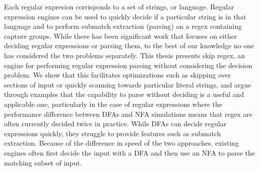\begin{thesisabstract}

Each regular expresion corrisponds to a set of strings, or
language. Regular expression engines can be used to quickly decide
if a particular string is in that language and to
perform submatch extraction (parsing) on a regex containing
capture groups. While there has been significant work that focuses on either
deciding regular expressions or parsing them, to
the best of our knowledge no one has considered the
two problems separately. This thesis presents skip
regex, an engine for performing regular expression
parsing without considering the decision problem.
We show that this facilitates optimizations such as skipping
over sections of input or quickly scanning towards particular
literal strings, and argue through examples that the capability to parse
without deciding is a useful and applicable one, particularly
in the case of regular expressions where the performance
difference between DFAs and NFA simulations means that regex are
often currently decided twice in practice. While DFAs can decide
regular expressions quickly, they struggle to provide features
such as submatch extraction. Because of the difference in speed
of the two approaches, existing engines often first decide the input
with a DFA and then use an NFA to parse the matching subset of input.

\nopagebreak
\end{thesisabstract}
